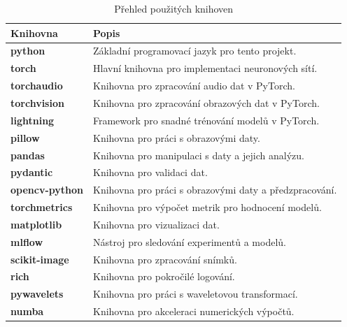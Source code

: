 \documentclass[male,czech,api_ing]{thesis}
\begin{document}
\begin{table}[H]
    \centering
    \begin{tabular}{|l|l|}
    \hline
    \textbf{Knihovna}       & \textbf{Popis}                                          \\ \hline
    \textbf{python}         & Základní programovací jazyk pro tento projekt.          \\ \hline
    \textbf{torch}          & Hlavní knihovna pro implementaci neuronových sítí.      \\ \hline
    \textbf{torchaudio}     & Knihovna pro zpracování audio dat v PyTorch.            \\ \hline
    \textbf{torchvision}    & Knihovna pro zpracování obrazových dat v PyTorch.       \\ \hline
    \textbf{lightning}      & Framework pro snadné trénování modelů v PyTorch.        \\ \hline
    \textbf{pillow}         & Knihovna pro práci s obrazovými daty.                   \\ \hline
    \textbf{pandas}         & Knihovna pro manipulaci s daty a jejich analýzu.        \\ \hline
    \textbf{pydantic}       & Knihovna pro validaci dat.                              \\ \hline
    \textbf{opencv-python}  & Knihovna pro práci s obrazovými daty a předzpracování.  \\ \hline
    \textbf{torchmetrics}   & Knihovna pro výpočet metrik pro hodnocení modelů.       \\ \hline
    \textbf{matplotlib}     & Knihovna pro vizualizaci dat.                           \\ \hline
    \textbf{mlflow}         & Nástroj pro sledování experimentů a modelů.             \\ \hline
    \textbf{scikit-image}   & Knihovna pro zpracování snímků.                         \\ \hline
    \textbf{rich}           & Knihovna pro pokročilé logování.                        \\ \hline
    \textbf{pywavelets}     & Knihovna pro práci s waveletovou transformací.          \\ \hline
    \textbf{numba}          & Knihovna pro akceleraci numerických výpočtů.            \\ \hline
    \end{tabular}
    \caption{Přehled použitých knihoven}
    \label{tab
    }
\end{table}
\end{document}

